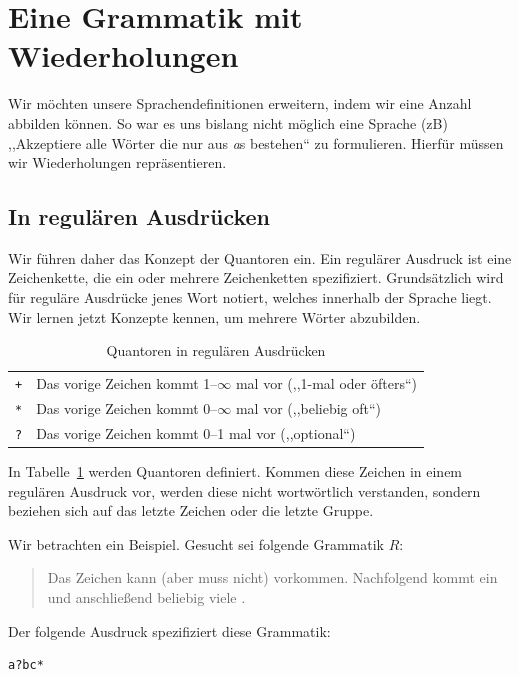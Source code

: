\section{Eine Grammatik mit Wiederholungen}
%
Wir möchten unsere Sprachendefinitionen erweitern, indem wir eine Anzahl abbilden können. So war es uns bislang nicht möglich eine Sprache (zB) ,,Akzeptiere alle Wörter die nur aus \emph{a}s bestehen`` zu formulieren. Hierfür müssen wir Wiederholungen repräsentieren.

\subsection{In regulären Ausdrücken}
%
Wir führen daher das Konzept der Quantoren ein. Ein regulärer Ausdruck ist eine Zeichenkette, die ein oder mehrere Zeichenketten spezifiziert. Grundsätzlich wird für reguläre Ausdrücke jenes Wort notiert, welches innerhalb der Sprache liegt. Wir lernen jetzt Konzepte kennen, um mehrere Wörter abzubilden.
%
\begin{table}[ht]
 \begin{center}
  \begin{tabular}{cl}
   \hline
    \texttt{+} & Das vorige Zeichen kommt 1--$\infty$ mal vor (,,1-mal oder öfters``) \\
    \texttt{*} & Das vorige Zeichen kommt 0--$\infty$ mal vor (,,beliebig oft``) \\
    \texttt{?} & Das vorige Zeichen kommt 0--1 mal vor (,,optional``) \\
   \hline
  \end{tabular}
  \caption{Quantoren in regulären Ausdrücken}
  \label{tab:quantifiers}
 \end{center}
\end{table}

In Tabelle~\ref{tab:quantifiers} werden Quantoren definiert. Kommen diese Zeichen in einem regulären Ausdruck vor, werden diese nicht wortwörtlich verstanden, sondern beziehen sich auf das letzte Zeichen oder die letzte Gruppe.

Wir betrachten ein Beispiel. Gesucht sei folgende Grammatik $R$:
\begin{quote}
  Das Zeichen  kann (aber muss nicht) vorkommen. Nachfolgend kommt ein  und
  anschließend beliebig viele .
\end{quote}

Der folgende Ausdruck spezifiziert diese Grammatik:
\begin{lstlisting}
a?bc*
\end{lstlisting}

